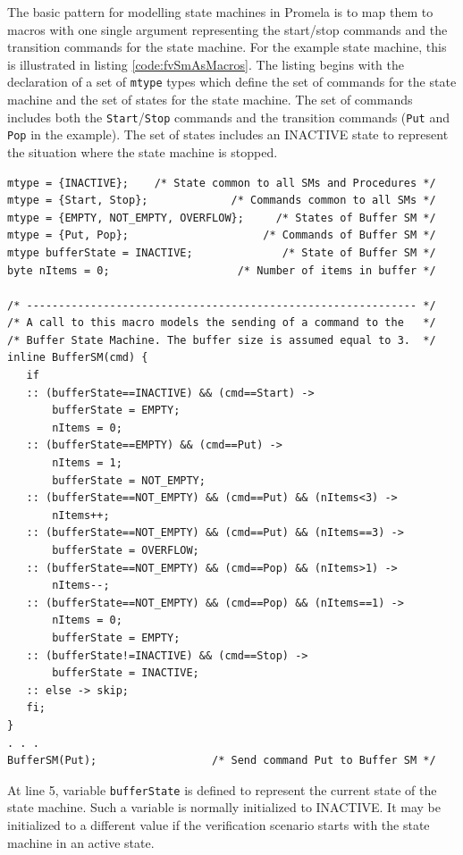 \documentclass[a4paper,10pt]{article}
\begin{document}
The basic pattern for modelling state machines in Promela is to map them to macros with one single argument representing the start/stop commands and the transition commands for the state machine. For the example state machine, this is illustrated in listing \ref{code:fvSmAsMacros}. The listing begins with the declaration of a set of \texttt{mtype} types which define the set of commands for the state machine and the set of states for the state machine. The set of commands includes both the \texttt{Start}/\texttt{Stop} commands and the transition commands (\texttt{Put} and \texttt{Pop} in the example). The set of states includes an INACTIVE state to represent the situation where the state machine is stopped. 

\begin{lstlisting}
mtype = {INACTIVE};    /* State common to all SMs and Procedures */
mtype = {Start, Stop};             /* Commands common to all SMs */
mtype = {EMPTY, NOT_EMPTY, OVERFLOW};     /* States of Buffer SM */
mtype = {Put, Pop};                     /* Commands of Buffer SM */
mtype bufferState = INACTIVE;              /* State of Buffer SM */
byte nItems = 0;                    /* Number of items in buffer */   

/* ------------------------------------------------------------- */
/* A call to this macro models the sending of a command to the   */ 
/* Buffer State Machine. The buffer size is assumed equal to 3.  */ 
inline BufferSM(cmd) {
   if
   :: (bufferState==INACTIVE) && (cmd==Start) -> 
       bufferState = EMPTY;
       nItems = 0;
   :: (bufferState==EMPTY) && (cmd==Put) -> 
       nItems = 1;
       bufferState = NOT_EMPTY;
   :: (bufferState==NOT_EMPTY) && (cmd==Put) && (nItems<3) -> 
       nItems++;
   :: (bufferState==NOT_EMPTY) && (cmd==Put) && (nItems==3) -> 
       bufferState = OVERFLOW;
   :: (bufferState==NOT_EMPTY) && (cmd==Pop) && (nItems>1) -> 
       nItems--;
   :: (bufferState==NOT_EMPTY) && (cmd==Pop) && (nItems==1) -> 
       nItems = 0;
       bufferState = EMPTY;
   :: (bufferState!=INACTIVE) && (cmd==Stop) -> 
       bufferState = INACTIVE;
   :: else -> skip;
   fi;
} 
. . .
BufferSM(Put);                  /* Send command Put to Buffer SM */
\end{lstlisting}

At line 5, variable \texttt{bufferState} is defined to represent the current state of the state machine. Such a variable is normally initialized to INACTIVE. It may be initialized to a different value if the verification scenario starts with the state machine in an active state.
\end{document}
